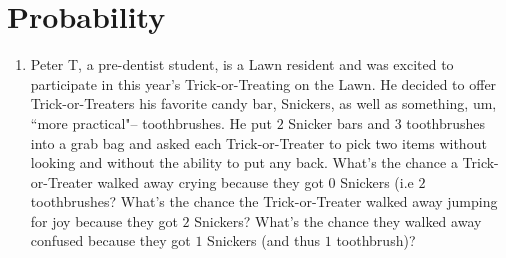\documentclass[10pt]{article}
\begin{document}
\newpage
\section{Probability}
\begin{enumerate}
\item Peter T, a pre-dentist student,  is a Lawn resident and was excited to participate in this year's Trick-or-Treating on the Lawn. He decided to offer Trick-or-Treaters his favorite candy bar, Snickers, as well as something, um, ``more practical"-- toothbrushes.   He put $2$ Snicker bars and $3$ toothbrushes into a grab bag and asked each Trick-or-Treater to pick two items without looking and without the ability to put any back. What's the chance a Trick-or-Treater  walked away crying because they got  $0$ Snickers (i.e $2$ toothbrushes?  What's the chance the Trick-or-Treater walked away jumping for joy because they got $2$ Snickers? What's the chance they walked away confused because they got $1$ Snickers (and thus $1$ toothbrush)?


\end{enumerate}
\end{document}
